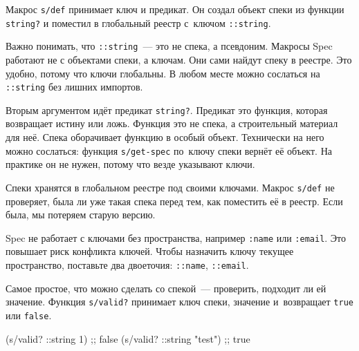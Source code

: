 
Макрос \verb|s/def| принимает ключ и предикат. Он создал объект спеки из
функции \verb|string?| и поместил в глобальный реестр с~ключом
\verb|::string|.

Важно понимать, что \verb|::string|~--- это не спека, а псевдоним. Макросы
Spec работают не с объектами спеки, а ключам. Они сами найдут спеку в
реестре. Это удобно, потому что ключи глобальны. В любом месте можно сослаться
на \verb|::string| без лишних импортов.


Вторым аргументом идёт предикат \verb|string?|. Предикат это функция,
которая возвращает истину или ложь. Функция это не спека, а строительный
материал для неё. Спека оборачивает функцию в особый объект. Технически на
него можно сослаться: функция \verb|s/get-spec| по~ключу спеки вернёт
её объект. На практике он не нужен, потому что везде указывают ключи.

\begin{english}
\end{english}


Спеки хранятся в глобальном реестре под своими ключами. Макрос \verb|s/def| не
проверяет, была ли уже такая спека перед тем, как поместить её в
реестр. Если была, мы потеряем старую версию.


Spec не работает с ключами без пространства, например \verb|:name| или
\verb|:email|. Это повышает риск конфликта ключей. Чтобы назначить ключу
текущее пространство, поставьте два двоеточия: \verb|::name|, \verb|::email|.


Самое простое, что можно сделать со спекой~--- проверить, подходит ли ей
значение. Функция \verb|s/valid?| принимает ключ спеки, значение и~возвращает
\verb|true| или \verb|false|.

\begin{english}
  \begin{clojure}
(s/valid? ::string 1)      ;; false
(s/valid? ::string "test") ;; true
  \end{clojure}
\end{english}


